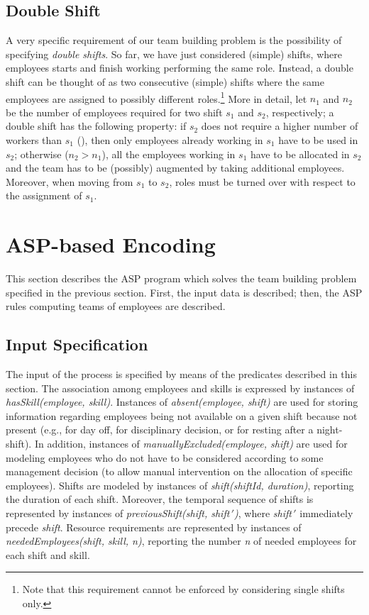 \documentclass{tlp}
\begin{document}
\subsection{Double Shift}
A very specific requirement of our team building problem is the possibility of specifying {\em double shifts}.
So far, we have just considered (simple) shifts, where employees starts and
finish working performing the same role.
Instead, a double shift can be thought of as two consecutive (simple) shifts 
where the same employees are assigned to possibly different roles.\footnote{Note that this requirement cannot be enforced by considering single shifts only.}
More in detail, let $n_{1}$ and $n_{2}$ be the number of employees required
for two shift $s_{1}$ and $s_{2}$, respectively; a double shift has the following
property: if $s_{2}$ does not require a higher number of workers than $s_{1}$ (),
then only employees already working in $s_{1}$ have to be used in $s_{2}$;
otherwise ($n_{2} > n_{1}$),  all the employees working in $s_1$
have to be allocated in $s_{2}$ and the team has to be (possibly)  augmented
by taking additional employees.
Moreover, when moving from $s_{1}$ to $s_{2}$, roles must be turned over
with respect to the assignment of $s_{1}$.


\section{ASP-based Encoding}\label{sec:encoding}

This section describes the ASP program which solves
the team building problem specified in the previous section.
First, the input data is described; then, the ASP rules computing
teams of employees are described.

\subsection{Input Specification}
The input of the process is specified by means of the predicates described in this section.
The association among employees and skills is expressed by instances of \textit{hasSkill(employee, skill)}.
Instances of \textit{absent(employee, shift)} are used for storing information regarding
employees being not available on a given shift because
not present (e.g., for day off, for disciplinary decision, or for resting after a night-shift).
In addition, instances of \textit{manuallyExcluded(employee, shift)}
are used for modeling employees who do not have to be considered according
to some management decision
(to allow manual intervention on the allocation of specific employees).
Shifts are modeled by instances of \textit{shift(shiftId, duration)}, reporting the duration of each shift.
Moreover, the temporal sequence of shifts is represented by instances of \textit{previousShift(shift, shift$\,'$)}, where \textit{shift$\,'$} immediately precede \textit{shift}.
Resource requirements are represented
by instances of \textit{neededEmployees(shift, skill, n)},
reporting the number \textit{n} of needed employees for each shift and skill.
\end{document}
